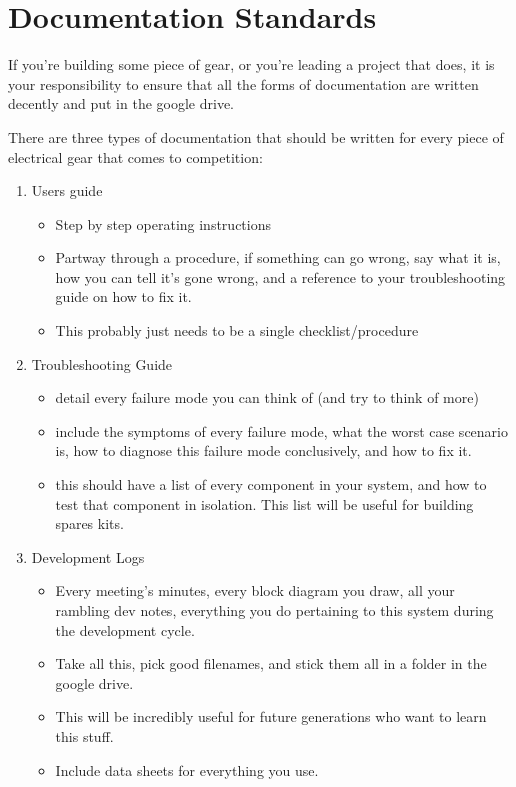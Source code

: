 \section{Documentation Standards}
If you're building some piece of gear, or you're leading a project that does, it is your responsibility to ensure that all the forms of documentation are written decently and put in the google drive.

There are three types of documentation that should be written for every piece of electrical gear that comes to competition:

\begin{enumerate}
\item Users guide
\begin{itemize}
\item Step by step operating instructions
\item Partway through a procedure, if something can go wrong, say what it is, how you can tell it's gone wrong, and a reference to your troubleshooting guide on how to fix it.
\item This probably just needs to be a single checklist/procedure
\end{itemize}
\item Troubleshooting Guide
\begin{itemize}
\item detail every failure mode you can think of (and try to think of more)
\item include the symptoms of every failure mode, what the worst case scenario is, how to diagnose this failure mode conclusively, and how to fix it.
\item this should have a list of every component in your system, and how to test that component in isolation. This list will be useful for building spares kits.
\end{itemize}
\item Development Logs
\begin{itemize}
\item Every meeting's minutes, every block diagram you draw, all your rambling dev notes, everything you do pertaining to this system during the development cycle.
\item Take all this, pick good filenames, and stick them all in a folder in the google drive.
\item This will be incredibly useful for future generations who want to learn this stuff.
\item Include data sheets for everything you use.
\end{itemize}
\end{enumerate}

